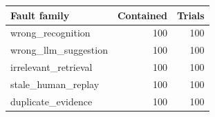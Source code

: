 \begin{tabular}{lrr}
\toprule
Fault family & Contained & Trials \\
\midrule
wrong\_recognition & 100 & 100 \\
wrong\_llm\_suggestion & 100 & 100 \\
irrelevant\_retrieval & 100 & 100 \\
stale\_human\_replay & 100 & 100 \\
duplicate\_evidence & 100 & 100 \\
\bottomrule
\end{tabular}
